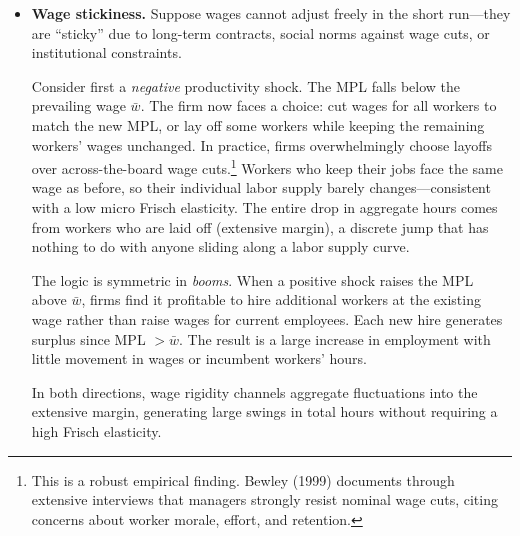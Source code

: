 \begin{itemize}
    \item \textbf{Wage stickiness.} Suppose wages cannot adjust freely in the short run---they are ``sticky'' due to long-term contracts, social norms against wage cuts, or institutional constraints.
    
    Consider first a \textit{negative} productivity shock. The MPL falls below the prevailing wage $\bar{w}$. The firm now faces a choice: cut wages for all workers to match the new MPL, or lay off some workers while keeping the remaining workers' wages unchanged. In practice, firms overwhelmingly choose layoffs over across-the-board wage cuts.\footnote{This is a robust empirical finding. Bewley (1999) documents through extensive interviews that managers strongly resist nominal wage cuts, citing concerns about worker morale, effort, and retention.} Workers who keep their jobs face the same wage as before, so their individual labor supply barely changes---consistent with a low micro Frisch elasticity. The entire drop in aggregate hours comes from workers who are laid off (extensive margin), a discrete jump that has nothing to do with anyone sliding along a labor supply curve.
    
    The logic is symmetric in \textit{booms}. When a positive shock raises the MPL above $\bar{w}$, firms find it profitable to hire additional workers at the existing wage rather than raise wages for current employees. Each new hire generates surplus since MPL $> \bar{w}$. The result is a large increase in employment with little movement in wages or incumbent workers' hours. 
    
    In both directions, wage rigidity channels aggregate fluctuations into the extensive margin, generating large swings in total hours without requiring a high Frisch elasticity.
    
    \begin{center}
\end{center}
\end{itemize}
